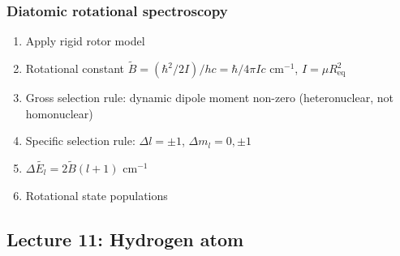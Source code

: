 \documentclass[11pt]{article}
\begin{document}
\subsubsection{Diatomic rotational spectroscopy}
\label{sec:orgd20b3b4}
\begin{enumerate}
\item Apply rigid rotor model
\item Rotational constant \(\tilde{B} = (\hbar^2/2I)/hc = \hbar/4\pi I c\) cm\(^{-1}\), \(I=\mu R_\mathrm{eq}^2\)
\item Gross selection rule: dynamic dipole moment non-zero (heteronuclear, not homonuclear)
\item Specific selection rule: \(\Delta l=\pm 1\), \(\Delta m_l=0, \pm1\)
\item \(\Delta \tilde{E_l}  = 2\tilde{B}(l+1)\) cm\(^{-1}\)
\item Rotational state populations
\end{enumerate}
\subsection{Lecture 11: Hydrogen atom}
\label{sec:orge54b4fb}
\end{document}
